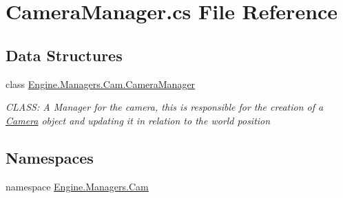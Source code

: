 \hypertarget{a00152}{}\section{Camera\+Manager.\+cs File Reference}
\label{a00152}
\subsection*{Data Structures}
\begin{DoxyCompactItemize}
\item 
class \hyperlink{a00494}{Engine.\+Managers.\+Cam.\+Camera\+Manager}
\begin{DoxyCompactList}\small\item\em C\+L\+A\+SS\+: A Manager for the camera, this is responsible for the creation of a \hyperlink{a00490}{Camera} object and updating it in relation to the world position \end{DoxyCompactList}\end{DoxyCompactItemize}
\subsection*{Namespaces}
\begin{DoxyCompactItemize}
\item 
namespace \hyperlink{a00267}{Engine.\+Managers.\+Cam}
\end{DoxyCompactItemize}
